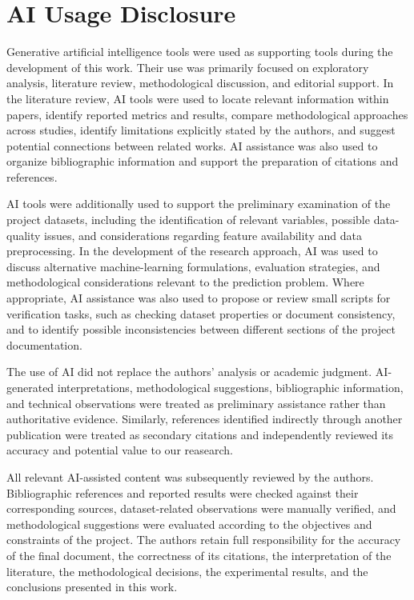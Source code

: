 \section*{AI Usage Disclosure}
\label{sec:ai-disclosure}

Generative artificial intelligence tools were used as supporting tools during the
development of this work. Their use was primarily focused on exploratory analysis,
literature review, methodological discussion, and editorial support. In the
literature review, AI tools were used to locate relevant information within papers,
identify reported metrics and results, compare methodological approaches across
studies, identify limitations explicitly stated by the authors, and suggest
potential connections between related works. AI assistance was also used to
organize bibliographic information and support the preparation of citations and
references.

AI tools were additionally used to support the preliminary examination of the
project datasets, including the identification of relevant variables, possible
data-quality issues, and considerations regarding feature availability and data
preprocessing. In the development of the research approach, AI was used to discuss
alternative machine-learning formulations, evaluation strategies, and
methodological considerations relevant to the prediction problem. Where
appropriate, AI assistance was also used to propose or review small scripts for
verification tasks, such as checking dataset properties or document consistency,
and to identify possible inconsistencies between different sections of the project
documentation.

The use of AI did not replace the authors' analysis or academic judgment. AI-
generated interpretations, methodological suggestions, bibliographic information,
and technical observations were treated as preliminary assistance rather than
authoritative evidence. Similarly, references identified indirectly through another
publication were treated as secondary citations and independently reviewed its
accuracy and potential value to our reasearch.

All relevant AI-assisted content was subsequently reviewed by the authors.
Bibliographic references and reported results were checked against their
corresponding sources, dataset-related observations were manually verified, and
methodological suggestions were evaluated according to the objectives and
constraints of the project. The authors retain full responsibility for the accuracy
of the final document, the correctness of its citations, the interpretation of the
literature, the methodological decisions, the experimental results, and the
conclusions presented in this work.